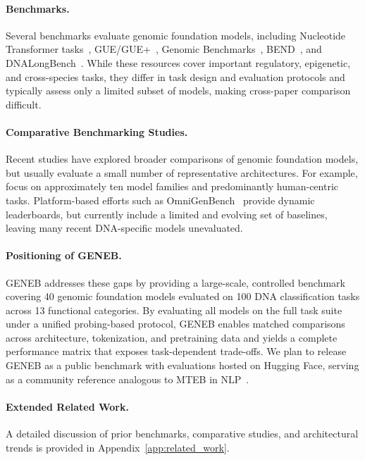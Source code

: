 \documentclass{llmxive}
\begin{document}
\paragraph{Benchmarks.}
Several benchmarks evaluate genomic foundation models, including Nucleotide Transformer tasks~\citep{dalla2023nucleotide}, GUE/GUE+~\citep{zhou2024dnabert2efficientfoundationmodel}, Genomic Benchmarks~\citep{Gresova2022.06.08.495248}, BEND~\citep{marin2024bendbenchmarkingdnalanguage}, and DNALongBench~\citep{Cheng2025.01.06.631595}. While these resources cover important regulatory, epigenetic, and cross-species tasks, they differ in task design and evaluation protocols and typically assess only a limited subset of models, making cross-paper comparison difficult.

\paragraph{Comparative Benchmarking Studies.}
Recent studies have explored broader comparisons of genomic foundation models, but usually evaluate a small number of representative architectures. For example, \citet{wang2025genomic} focus on approximately ten model families and predominantly human-centric tasks. Platform-based efforts such as OmniGenBench~\citep{wang2025omnigenbenchbenchmarkomnipotentmultimodal} provide dynamic leaderboards, but currently include a limited and evolving set of baselines, leaving many recent DNA-specific models unevaluated.

\paragraph{Positioning of GENEB.}
GENEB addresses these gaps by providing a large-scale, controlled benchmark covering 40 genomic foundation models evaluated on 100 DNA classification tasks across 13 functional categories. By evaluating all models on the full task suite under a unified probing-based protocol, GENEB enables matched comparisons across architecture, tokenization, and pretraining data and yields a complete performance matrix that exposes task-dependent trade-offs. We plan to release GENEB as a public benchmark with evaluations hosted on Hugging Face, serving as a community reference analogous to MTEB in NLP~\citep{muennighoff2023mtebmassivetextembedding}.

\paragraph{Extended Related Work.}
A detailed discussion of prior benchmarks, comparative studies, and architectural trends is provided in Appendix~\ref{app:related_work}.
\end{document}
